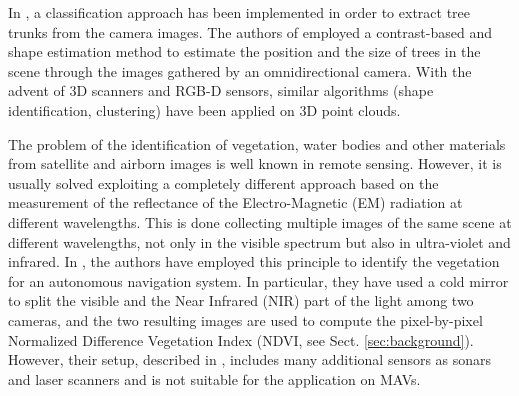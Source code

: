 \documentclass[letterpaper, 10pt, conference]{ieeeconf}      %
\newcommand{\paolo}[1]{{\textcolor{red}{#1}}}
\begin{document}
%
%
In \cite{2008_AlGeHe}, a classification approach has been implemented in order to extract tree trunks from the camera images.
The authors of \cite{2011_YaRa} employed a contrast-based and shape estimation method to estimate the position and the size of trees in the scene through the images gathered by an omnidirectional camera.
With the advent of 3D scanners and RGB-D sensors, similar algorithms (shape identification, clustering) have been applied \cite{2012_SoSuIa} on 3D point clouds.

The problem of the identification of vegetation, water bodies and other materials from satellite and airborn images is well known in remote sensing.
However, it is usually solved exploiting a completely different approach based on the measurement of the reflectance of the Electro-Magnetic (EM) radiation at different wavelengths.
This is done collecting multiple images of the same scene at different wavelengths, not only in the visible spectrum but also in ultra-violet and infrared.
In \cite{2007_BrUnBa}, the authors have employed this principle to identify the vegetation for an autonomous navigation system.
In particular, they have used a cold mirror to split the visible and the Near Infrared (NIR) part of the light among two cameras, and the two resulting images are used to compute the pixel-by-pixel Normalized Difference Vegetation Index (NDVI, see Sect. \ref{sec:background}).
However, their setup, described in \cite{2006_Kelly}, includes many additional sensors as sonars and laser scanners and is not suitable for the application on MAVs.


\end{document}
